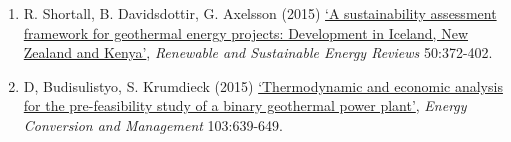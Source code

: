 \documentclass[12pts,a4paper]{report}%
\begin{document}
\begin{enumerate}[label=\bfseries Group \arabic*:]
%
\item R. Shortall, B. Davidsdottir, G. Axelsson (2015) \href{http://dx.doi.org/10.1016/j.rser.2015.04.175}{`A sustainability assessment framework for geothermal energy projects: Development in Iceland, New Zealand and Kenya'}, {\it Renewable and Sustainable Energy Reviews} 50:372-402.
%
\item D, Budisulistyo, S. Krumdieck (2015) \href{http://dx.doi.org/10.1016/j.enconman.2015.06.069}{`Thermodynamic and economic analysis for the pre-feasibility study of a binary geothermal power plant'}, {\it Energy Conversion and Management} 103:639-649.
%
\end{enumerate}




%  
\end{document}
